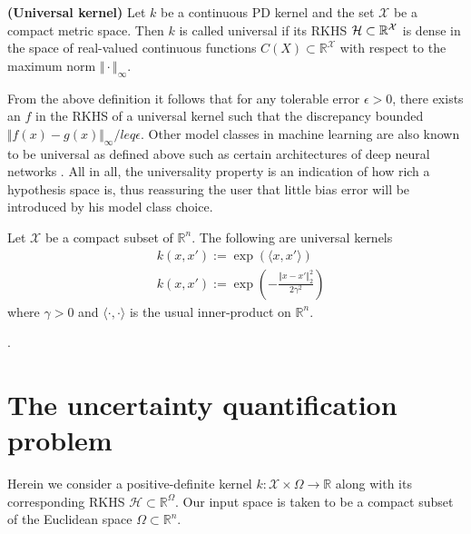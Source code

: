 \begin{definition}
	\textbf{(Universal kernel)}
	Let $k$ be a continuous PD kernel and the set $\mathcal{X}$ be a compact metric space. Then $k$ is called universal if its RKHS $\mathcal{H} \subset \mathbb{R}^\mathcal{X}$ is dense in the space of real-valued continuous functions $C(X) \subset \mathbb{R}^\mathcal{X}$ with respect to the maximum norm $\Vert \cdot \Vert_\infty$.
\end{definition}

From the above definition it follows that for any tolerable error $\epsilon > 0$, there exists an $f$ in the RKHS of a universal kernel such that the discrepancy bounded $\Vert f(x) - g(x) \Vert_\infty /leq \epsilon$.
Other model classes in machine learning are also known to be universal as defined above such as certain architectures of deep neural networks \citep{kidger2020universal}. All in all, the universality property is an indication of how rich a hypothesis space is, thus reassuring the user that little bias error will be introduced by his model class choice.

\begin{proposition}
	Let $\mathcal{X}$ be a compact subset of $\mathbb{R}^n$. The following are universal kernels
	\begin{align}
		&k(x,x') := \exp( \langle x, x' \rangle) \\
		&k(x,x') := \exp\left( - \frac{\Vert x - x' \Vert^2_2}{2 \gamma^2} \right)
	\end{align}
	where $\gamma >0$ and $\langle \cdot, \cdot \rangle$ is the usual inner-product on $\mathbb{R}^n$. 
\end{proposition}

\begin{my_proof}
	\cite[Corollary~4.58]{steinwart2008svm_book}.
\end{my_proof}


\section{The uncertainty quantification problem}


Herein we consider a positive-definite kernel $k:\mathcal{X} \times \Omega \rightarrow \mathds{R}$ along with its corresponding RKHS $\mathcal{H} \subset \mathds{R}^\Omega$. Our input space is taken to be a compact subset of the Euclidean space $\Omega \subset \mathbb{R}^n$. 

